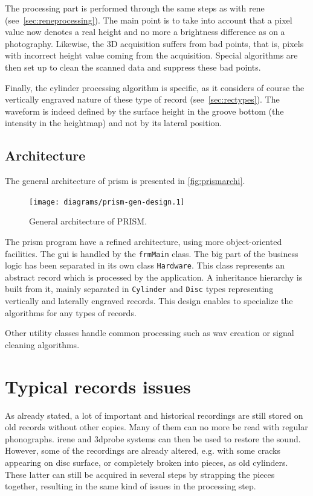 The processing part is performed through the same steps as with \gls{rene} (see~\autoref{sec:reneprocessing}). The main point is to take into account that a pixel value now denotes a real height and no more a brightness difference as on a photography. Likewise, the 3D acquisition suffers from bad points, that is, pixels with incorrect height value coming from the acquisition. Special algorithms are then set up to clean the scanned data and suppress these bad points.

Finally, the cylinder processing algorithm is specific, as it considers of course the vertically engraved nature of these type of record (see~\autoref{sec:rectypes}). The waveform is indeed defined by the surface height in the groove bottom (the intensity in the heightmap) and not by its lateral position.

\subsection{Architecture}
\label{sec:prismarchi}

The general architecture of \gls{prism} is presented in \autoref{fig:prismarchi}.

\begin{figure}[!ht]
\centering
\texttt{[image: diagrams/prism-gen-design.1]}
\caption{General architecture of PRISM.}
\label{fig:prismarchi}
\end{figure}

The \gls{prism} program have a refined architecture, using more object-oriented facilities. The \gls{gui} is handled by the \texttt{frmMain} class. The big part of the business logic has been separated in its own class \texttt{Hardware}. This class represents an abstract record which is processed by the application. A inheritance hierarchy is built from it, mainly separated in \texttt{Cylinder} and \texttt{Disc} types representing vertically and laterally engraved records. This design enables to specialize the algorithms for any types of records.

Other utility classes handle common processing such as \gls{wav} creation or signal cleaning algorithms.

\section{Typical records issues}

As already stated, a lot of important and historical recordings are still stored on old records without other copies. Many of them can no more be read with regular phonographs. \gls{irene} and \gls{3dprobe} systems can then be used to restore the sound. However, some of the recordings are already altered, e.g. with some cracks appearing on disc surface, or completely broken into pieces, as old cylinders. These latter can still be acquired in several steps by strapping the pieces together, resulting in the same kind of issues in the processing step.

